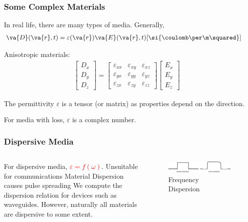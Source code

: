 \documentclass[10pt, compress]{beamer}
\renewcommand{\O}{\omega}  %
\newcommand{\E}{\varepsilon}  %
\begin{document}
\begin{frame}
  \frametitle{Some Complex Materials}

In real life, there are many types of media. Generally,
\begin{align*}
  \va{D}(\va{r}, t) &= \E(\va{r}) \va{E}(\va{r}, t)  [\si{\coulomb \per \m \squared}]
\end{align*}

Anisotropic materials:
\begin{align*}
\begin{bmatrix}
D_{x} \\
D_{y} \\
D_{z}
\end{bmatrix}
=
\begin{bmatrix}
\E_{x x} & \E_{x y} & \E_{x z} \\
\E_{y x} & \E_{y y} & \E_{y z} \\
\E_{z x} & \E_{z y} & \E_{z z}
\end{bmatrix}
\begin{bmatrix}
E_{x} \\
E_{y} \\
E_{z}
\end{bmatrix}
\end{align*}

The permittivity $\E$ is a tensor (or matrix) as properties depend on the direction.

For media with loss, $\E$ is a complex number.
\end{frame}
\begin{frame}
\frametitle{Dispersive Media}
\begin{columns}[T] %
  \begin{column}{.4\textwidth}
\begin{outline}
  \1 For dispersive media, \textcolor{red}{$\E = f(\O)$}.
  \2 Unsuitable for communications
  \3 Material Dispersion causes pulse spreading
  \1 We compute the dispersion relation for devices such as waveguides.
  \1 However, naturally all materials are dispersive to some extent.
\end{outline}
   \end{column}
 \begin{column}[T]{.6\textwidth}
        \begin{figure}
      \centering
          \includegraphics[width=1.0\textwidth]{DISPERSION.pdf}
      \caption{Frequency Dispersion}
    \end{figure}
  \end{column}%
\end{columns}
\end{frame}
\end{document}
